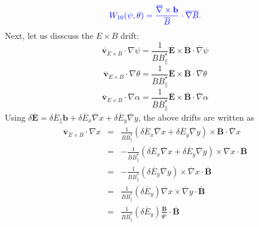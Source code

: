 \documentclass{article}
\newcommand{\tmcolor}[2]{{\color{#1}{#2}}}
\begin{document}
\begin{equation}
  \tmcolor{blue}{W_{10} (\psi, \theta) = \frac{\overline{\nabla} \times
  \mathbf{b}}{\overline{B}} \cdot \overline{\nabla} \overline{B} .}
\end{equation}
Next, let us disscuss the $E \times B$ drift:
\begin{equation}
  \overline{\mathbf{v}}_{E \times B} \cdot \nabla \psi = \frac{1}{\overline{B}
  \overline{B}^{\star}_{\parallel}} \overline{\mathbf{E}} \times
  \overline{\mathbf{B}} \cdot \overline{\nabla} \psi
\end{equation}
\begin{equation}
  \overline{\mathbf{v}}_{E \times B} \cdot \nabla \theta =
  \frac{1}{\overline{B}  \overline{B}^{\star}_{\parallel}}
  \overline{\mathbf{E}} \times \overline{\mathbf{B}} \cdot \overline{\nabla}
  \theta
\end{equation}
\begin{equation}
  \overline{\mathbf{v}}_{E \times B} \cdot \nabla \alpha =
  \frac{1}{\overline{B}  \overline{B}^{\star}_{\parallel}}
  \overline{\mathbf{E}} \times \overline{\mathbf{B}} \cdot \overline{\nabla}
  \alpha
\end{equation}
Using $\delta \overline{\mathbf{E}} = \delta \overline{E}_{\parallel}
\mathbf{b}+ \delta \overline{E}_x \overline{\nabla} x + \delta \overline{E}_y
\overline{\nabla} y$, the above drifts are written as
\begin{eqnarray}
  \overline{\mathbf{v}}_{E \times B} \cdot \nabla x & = &
  \frac{1}{\overline{B}  \overline{B}^{\star}_{\parallel}} (\delta
  \overline{E}_x \overline{\nabla} x + \delta \overline{E}_y \overline{\nabla}
  y) \times \overline{\mathbf{B}} \cdot \overline{\nabla} x \nonumber\\
  & = & - \frac{1}{\overline{B}  \overline{B}^{\star}_{\parallel}} (\delta
  \overline{E}_x \overline{\nabla} x + \delta \overline{E}_y \overline{\nabla}
  y) \times \overline{\nabla} x \cdot \overline{\mathbf{B}} \nonumber\\
  & = & - \frac{1}{\overline{B}  \overline{B}^{\star}_{\parallel}} (\delta
  \overline{E}_y \overline{\nabla} y) \times \overline{\nabla} x \cdot
  \overline{\mathbf{B}} \nonumber\\
  & = & \frac{1}{\overline{B}  \overline{B}^{\star}_{\parallel}} (\delta
  \overline{E}_y) \overline{\nabla} x \times \overline{\nabla} y \cdot
  \overline{\mathbf{B}} \nonumber\\
  & = & \frac{1}{\overline{B}  \overline{B}^{\star}_{\parallel}} (\delta
  \overline{E}_y) \frac{\overline{\mathbf{B}}}{\overline{\Psi}'} \cdot
  \overline{\mathbf{B}} 
\end{eqnarray}
\end{document}
